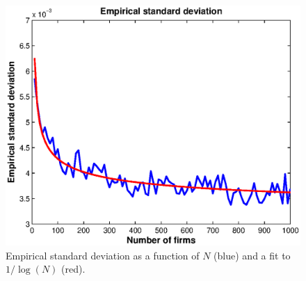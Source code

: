 \documentclass[12pt]{article}
\begin{document}
\begin{figure}
\begin{center}
\includegraphics[scale=0.8]{simulation.eps} 
\end{center}
\caption{Empirical standard deviation as a function of $N$ (blue) and a fit to $1/\log(N)$ (red).\label{Emp_std}}
\end{figure}

\clearpage



\end{document}
